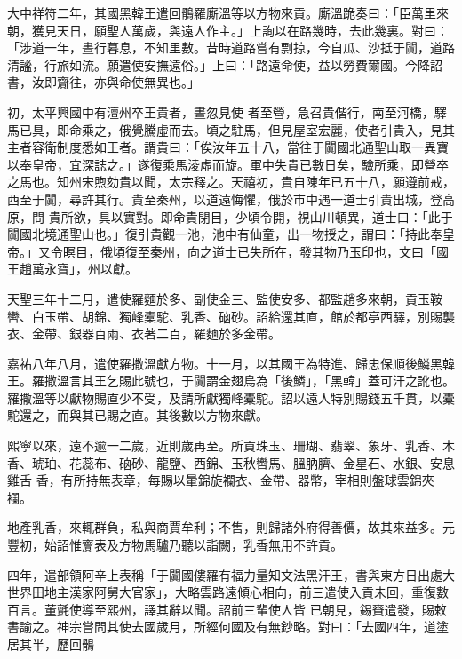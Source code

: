 \begin{pinyinscope}
 大中祥符二年，其國黑韓王遣回鶻羅廝溫等以方物來貢。廝溫跪奏曰：「臣萬里來朝，獲見天日，願聖人萬歲，與遠人作主。」上詢以在路幾時，去此幾裏。對曰：「涉道一年，晝行暮息，不知里數。昔時道路嘗有剽掠，今自瓜、沙抵于闐，道路清謐，行旅如流。願遣使安撫遠俗。」上曰：「路遠命使，益以勞費爾國。今降詔書，汝即齎往，亦與命使無異也。」



 初，太平興國中有澶州卒王貴者，晝忽見使
 者至營，急召貴偕行，南至河橋，驛馬已具，即命乘之，俄覺騰虛而去。頃之駐馬，但見屋室宏麗，使者引貴入，見其主者容衛制度悉如王者。謂貴曰：「俟汝年五十八，當往于闐國北通聖山取一異寶以奉皇帝，宜深誌之。」遂復乘馬淩虛而旋。軍中失貴已數日矣，驗所乘，即營卒之馬也。知州宋煦劾貴以聞，太宗釋之。天禧初，貴自陳年已五十八，願遵前戒，西至于闐，尋許其行。貴至秦州，以道遠悔懼，俄於市中遇一道士引貴出城，登高原，問
 貴所欲，具以實對。即命貴閉目，少頃令開，視山川頓異，道士曰：「此于闐國北境通聖山也。」復引貴觀一池，池中有仙童，出一物授之，謂曰：「持此奉皇帝。」又令瞑目，俄頃復至秦州，向之道士已失所在，發其物乃玉印也，文曰「國王趙萬永寶」，州以獻。



 天聖三年十二月，遣使羅麵於多、副使金三、監使安多、都監趙多來朝，貢玉鞍轡、白玉帶、胡錦、獨峰橐駝、乳香、硇砂。詔給還其直，館於都亭西驛，別賜襲衣、金帶、銀器百兩、衣著二百，羅麵於多金帶。



 嘉祐八年八月，遣使羅撒溫獻方物。十一月，以其國王為特進、歸忠保順後鱗黑韓王。羅撒溫言其王乞賜此號也，于闐謂金翅烏為「後鱗」，「黑韓」蓋可汗之訛也。羅撒溫等以獻物賜直少不受，及請所獻獨峰橐駝。詔以遠人特別賜錢五千貫，以橐駝還之，而與其已賜之直。其後數以方物來獻。



 熙寧以來，遠不逾一二歲，近則歲再至。所貢珠玉、珊瑚、翡翠、象牙、乳香、木香、琥珀、花蕊布、硇砂、龍鹽、西錦、玉秋轡馬、膃肭臍、金星石、水銀、安息雞舌
 香，有所持無表章，每賜以暈錦旋襴衣、金帶、器幣，宰相則盤球雲錦夾襴。



 地產乳香，來輒群負，私與商賈牟利；不售，則歸諸外府得善價，故其來益多。元豐初，始詔惟齎表及方物馬驢乃聽以詣闕，乳香無用不許貢。



 四年，遣部領阿辛上表稱「于闐國僂羅有福力量知文法黑汗王，書與東方日出處大世界田地主漢家阿舅大官家」，大略雲路遠傾心相向，前三遣使入貢未回，重復數百言。董氈使導至熙州，譯其辭以聞。詔前三輩使人皆
 已朝見，錫賚遣發，賜敕書諭之。神宗嘗問其使去國歲月，所經何國及有無鈔略。對曰：「去國四年，道塗居其半，歷回鶻
 

\end{pinyinscope}

